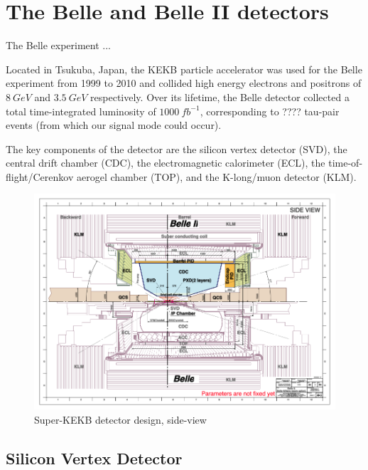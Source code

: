 \documentclass[12pt]{thesis}  %
\begin{document}
\pagebreak


\chapter{The Belle and Belle II detectors}

The Belle experiment ...

Located in Tsukuba, Japan, the KEKB particle accelerator was used for the Belle experiment from 1999 to 2010 and collided high energy electrons and positrons of $\SI{8}{GeV}$ and $\SI{3.5}{GeV}$ respectively. Over its lifetime, the Belle detector collected a total time-integrated luminosity of $\SI{1000}{fb^{-1}}$, corresponding to ???? tau-pair events (from which our signal mode could occur).

The key components of the detector are the silicon vertex detector (SVD), the central drift chamber (CDC), the electromagnetic calorimeter (ECL), the time-of-flight/Cerenkov aerogel chamber (TOP), and the K-long/muon detector (KLM).

\begin{figure}[h]
\centering
\includegraphics[width=0.8\linewidth]{images/super-kekb-side-view.png}
\caption{Super-KEKB detector design, side-view}
\label{}
\end{figure}



\section{Silicon Vertex Detector}


\end{document}

